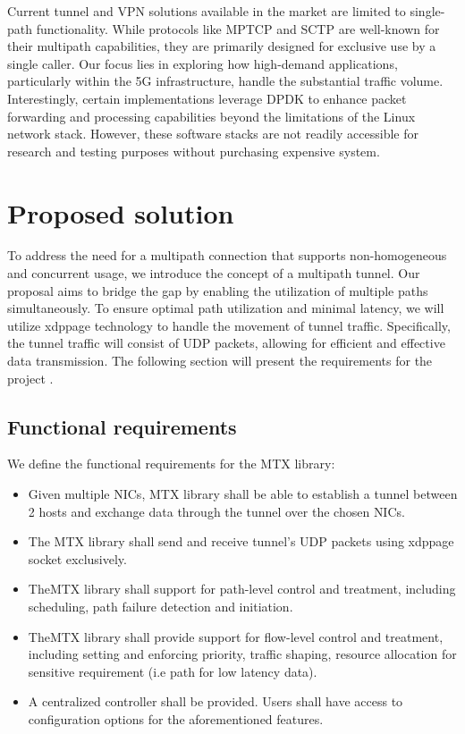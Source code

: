 Current tunnel and VPN solutions available in the market are limited to single-path functionality. While protocols like \ac{MPTCP} and \ac{SCTP} are well-known for their multipath capabilities, they are primarily designed for exclusive use by a single caller.
Our focus lies in exploring how high-demand applications, particularly within the 5G infrastructure, handle the substantial traffic volume. Interestingly, certain implementations leverage DPDK to enhance packet forwarding and processing capabilities beyond the limitations of the Linux network stack. However, these software stacks are not readily accessible for research and testing purposes without purchasing expensive system.

\section{Proposed solution}
To address the need for a multipath connection that supports non-homogeneous and concurrent usage, we introduce the concept of a multipath tunnel. 
Our proposal aims to bridge the gap by enabling the utilization of multiple paths simultaneously.
To ensure optimal path utilization and minimal latency, we will utilize \ac{xdppage} technology to handle the movement of tunnel traffic. 
Specifically, the tunnel traffic will consist of UDP packets, allowing for efficient and effective data transmission.
The following section will present the requirements for the project .

\subsection{Functional requirements}
We define the functional requirements for the \ac{MTX} library:
\begin{itemize}
    \item Given multiple \ac{NIC}s, \ac{MTX} library shall be able to establish a tunnel between 2 hosts and exchange data through the tunnel over the chosen \ac{NIC}s.
    \item The \ac{MTX} library shall send and receive tunnel's UDP packets using \ac{xdppage} socket exclusively.
    \item The\ac{MTX} library shall support for path-level control and treatment, including scheduling, path failure detection and initiation. 
    \item The\ac{MTX} library shall provide support for flow-level control and treatment, including setting and enforcing priority, traffic shaping, resource allocation for sensitive requirement (i.e path for low latency data).
    \item A centralized controller shall be provided. Users shall have access to configuration options for the aforementioned features.
\end{itemize}

